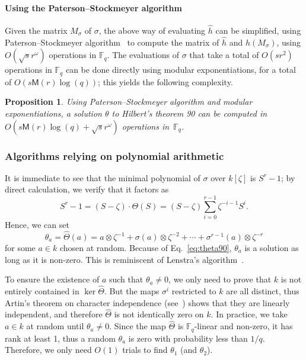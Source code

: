 \documentclass[12pt]{article}
\theoremstyle{plain}
\newtheorem{proposition}[theorem]{Proposition}
\theoremstyle{definition}
\def\F{\ensuremath{\mathbb{F}}}
\def\MM{\ensuremath{\mathsf{M}}}
\newcounter{algorithm}
\begin{document}
\paragraph{Using the Paterson--Stockmeyer algorithm}
Given the matrix $M_\sigma$ of $\sigma$, the above way of evaluating
$\hat{h}$ can be simplified, using Paterson--Stockmeyer
algorithm~\cite{paterson_stockmeyer} to compute the matrix of $\hat h$
and $h(M_\sigma)$, using $O(\sqrt{s} r^\omega)$ operations in
$\F_q$. The evaluations of $\sigma$ that take a total of $O(s r^2)$
operations in $\F_q$ can be done directly using modular
exponentiations, for a total of $O(s \MM(r) \log(q))$; 
this yields the following complexity.

\begin{proposition}
Using Paterson--Stockmeyer algorithm and modular exponentiations,
a solution $\theta$ to Hilbert's theorem 90 can be computed in
$O(s \MM(r) \log(q) + \sqrt{s} r^\omega)$ operations in~$\F_q$.
\end{proposition}

\subsubsection{Algorithms relying on polynomial arithmetic}

It is immediate to see that the minimal polynomial of $\sigma$ over $k[\zeta]$ is
$S^r-1$; by direct calculation, we verify that it
factors as
\begin{equation}
  \label{eq:theta90}
  S^r-1 = (S-\zeta)\cdot\Theta(S) =
  (S-\zeta)\sum_{i=0}^{r-1} \zeta^{-i-1}S^i. 
\end{equation}
Hence, we can set
\begin{equation}
  \label{eq:thetaa}
  \theta_a = \hat\Theta(a)
  =  a\otimes\zeta^{-1} + \sigma(a)\otimes\zeta^{-2} + \cdots + \sigma^{r-1}(a)\otimes\zeta^{-r}
\end{equation}
for some $a\in k$ chosen at random. %
Because of Eq.~\eqref{eq:theta90}, $\theta_a$ is a solution as long as
it is non-zero. %
This is reminiscent of Lenstra's algorithm~\cite[Th.~5.2]{LenstraJr91}.

To ensure the existence of $a$ such that $\theta_a\ne0$, we only need
to prove that $k$ is not entirely contained in $\ker\hat\Theta$. %
But the maps $\sigma^i$ restricted to $k$ are all distinct, thus
Artin's theorem on character independence (see~\cite[Ch~VI, Theorem~4.1]{lang})
shows that they are linearly 
independent, and therefore $\hat\Theta$ is not identically zero on $k$.
In practice, we take $a \in k$ at random until
$\theta_a\ne0$. Since the map $\hat\Theta$ is
$\F_q$-linear and non-zero, it has rank at least 1, thus a
random $\theta_a$ is zero with probability less than $1 / q$. Therefore, we only 
need $O(1)$ trials to find $\theta_1$ (and $\theta_2$).
\end{document}
